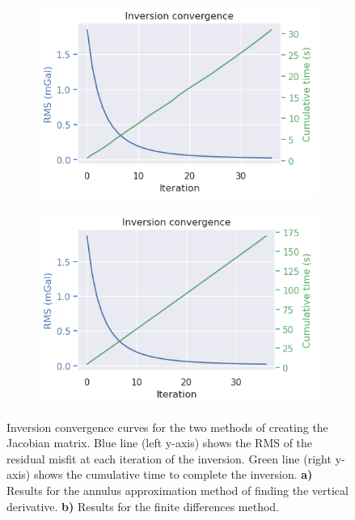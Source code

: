 \begin{figure}[!ht]
  \centering
    \begin{subfigure}[t]{.48\textwidth}
        \centering
        \includegraphics[width=\textwidth]{figures/chp3/chp3_simple_convergence.png}
        \caption{}
    \end{subfigure}
    \begin{subfigure}[t]{.48\textwidth}
        \centering
        \includegraphics[width=\textwidth]{figures/chp3/chp3_simple_prisms_derivative_convergence.png}
        \caption{}
    \end{subfigure}
  \caption[Finite differences and annulus approximation convergence curves]{Inversion convergence curves for the two methods of creating the Jacobian matrix. Blue line (left y-axis) shows the RMS of the residual misfit at each iteration of the inversion. Green line (right y-axis) shows the cumulative time to complete the inversion. \textbf{a)} Results for the annulus approximation method of finding the vertical derivative. \textbf{b)} Results for the finite differences method.}
    \label{fig:chp3_annulus_vs_prisms_convergence}
\end{figure}

